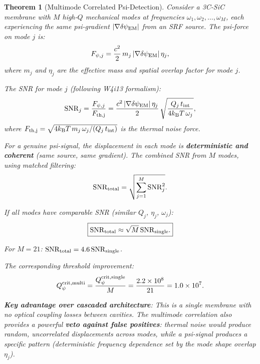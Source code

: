 \documentclass[11pt]{article}
\newcommand{\ee}[1]{\times 10^{#1}}
\newcommand{\kB}{k_{\mathrm{B}}}
\newcommand{\Qpsi}{Q_\psi}
\newcommand{\SNR}{\mathrm{SNR}}
\newcommand{\dpsiEM}{\delta\psi_{\rm EM}}
\newtheorem{theorem}{Theorem}[section]
\theoremstyle{definition}
\theoremstyle{remark}
\begin{document}
\begin{theorem}[Multimode Correlated Psi-Detection]
\label{thm:multimode}
Consider a 3C-SiC membrane with $M$ high-$Q$ mechanical modes
at frequencies $\omega_1, \omega_2, \ldots, \omega_M$, each
experiencing the same psi-gradient $|\nabla\dpsiEM|$ from an
SRF source. The psi-force on mode $j$ is:
\begin{equation}
F_{\psi,j} = \frac{c^2}{2}\,m_j\,|\nabla\dpsiEM|\,\eta_j,
\end{equation}
where $m_j$ and $\eta_j$ are the effective mass and spatial
overlap factor for mode $j$.

The SNR for mode $j$ (following W4i13 formalism):
\begin{equation}
\SNR_j = \frac{F_{\psi,j}}{F_{\rm th,j}}
= \frac{c^2\,|\nabla\dpsiEM|\,\eta_j}{2}\,
\sqrt{\frac{Q_j\,t_{\rm int}}{4\kB T\,\omega_j}},
\end{equation}
where $F_{\rm th,j} = \sqrt{4\kB T\,m_j\,\omega_j/(Q_j\,t_{\rm int})}$
is the thermal noise force.

For a genuine psi-signal, the displacement in each mode is
\textbf{deterministic and coherent} (same source, same gradient).
The combined SNR from $M$ modes, using matched filtering:
\begin{equation}
\SNR_{\rm total} = \sqrt{\sum_{j=1}^{M} \SNR_j^2}.
\end{equation}

If all modes have comparable SNR (similar $Q_j$, $\eta_j$, $\omega_j$):
\begin{equation}
\boxed{
\SNR_{\rm total} \approx \sqrt{M}\,\SNR_{\rm single}.
}
\label{eq:multimode_SNR}
\end{equation}

For $M = 21$: $\SNR_{\rm total} = 4.6\,\SNR_{\rm single}$.

The corresponding threshold improvement:
\begin{equation}
\Qpsi^{\rm crit, multi} = \frac{\Qpsi^{\rm crit, single}}{M}
= \frac{2.2\ee{8}}{21} = 1.0\ee{7}.
\end{equation}

\textbf{Key advantage over cascaded architecture}: This is a
\emph{single membrane} with no optical coupling losses between
cavities. The multimode correlation also provides a powerful
\textbf{veto against false positives}: thermal noise would produce
random, uncorrelated displacements across modes, while a psi-signal
produces a specific pattern (deterministic frequency dependence set
by the mode shape overlap $\eta_j$).
\end{theorem}
\end{document}
